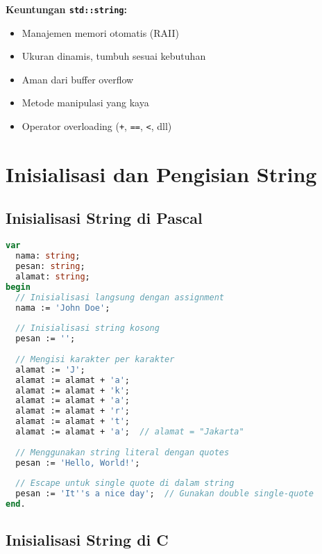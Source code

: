 \documentclass[../main.tex]{subfiles}
\begin{document}
\textbf{Keuntungan \texttt{std::string}:}
\begin{itemize}
  \item Manajemen memori otomatis (RAII)
  \item Ukuran dinamis, tumbuh sesuai kebutuhan
  \item Aman dari buffer overflow
  \item Metode manipulasi yang kaya
  \item Operator overloading (\texttt{+}, \texttt{==}, \texttt{<}, dll)
\end{itemize}

\section{Inisialisasi dan Pengisian String}

\subsection{Inisialisasi String di Pascal}

\begin{lstlisting}[language=Pascal, caption={Inisialisasi string di Pascal}]
var
  nama: string;
  pesan: string;
  alamat: string;
begin
  // Inisialisasi langsung dengan assignment
  nama := 'John Doe';
  
  // Inisialisasi string kosong
  pesan := '';
  
  // Mengisi karakter per karakter
  alamat := 'J';
  alamat := alamat + 'a';
  alamat := alamat + 'k';
  alamat := alamat + 'a';
  alamat := alamat + 'r';
  alamat := alamat + 't';
  alamat := alamat + 'a';  // alamat = "Jakarta"
  
  // Menggunakan string literal dengan quotes
  pesan := 'Hello, World!';
  
  // Escape untuk single quote di dalam string
  pesan := 'It''s a nice day';  // Gunakan double single-quote
end.
\end{lstlisting}

\subsection{Inisialisasi String di C}
\end{document}
